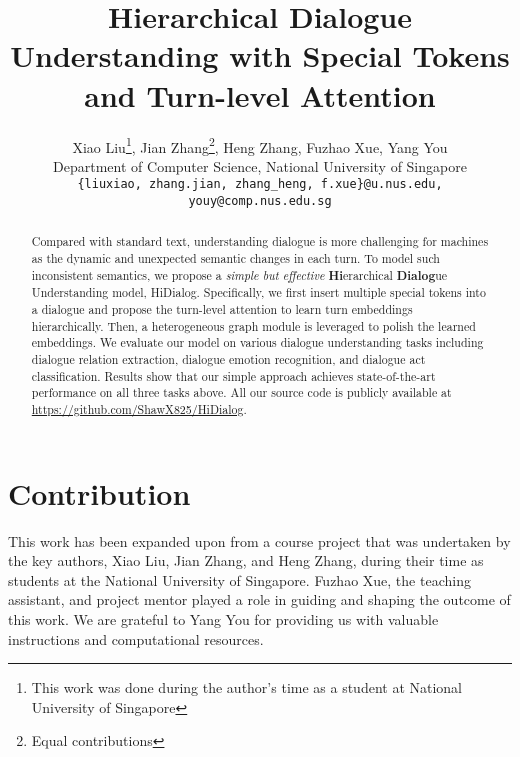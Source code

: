 \documentclass{article} %
\title{Hierarchical Dialogue Understanding with Special Tokens and Turn-level Attention}
\author{Xiao Liu\thanks{This work was done during the author's time as a student at National University of Singapore}, Jian Zhang\thanks{Equal contributions}, Heng Zhang\samethanks, Fuzhao Xue, Yang You \\
Department of Computer Science, National University of Singapore\\
\texttt{\{liuxiao, zhang.jian, zhang\_heng, f.xue\}@u.nus.edu,} \\ \texttt{youy@comp.nus.edu.sg} \\
}
\newcommand{\LX}[1]{\textcolor{teal}{[Xiao: #1]}}
\newcommand{\FZ}[1]{\textcolor{red}{[Fuzhao: #1]}}
\begin{document}
\maketitle

\begin{abstract}
Compared with standard text, understanding dialogue is more challenging for machines as the dynamic and unexpected semantic changes in each turn. To model such inconsistent semantics, we propose a \emph{simple but effective} \textbf{Hi}erarchical \textbf{Dialog}ue Understanding model, HiDialog. Specifically, we first insert multiple special tokens into a dialogue and propose the turn-level attention to learn turn embeddings hierarchically. Then, a heterogeneous graph module is leveraged to polish the learned embeddings. We evaluate our model on various dialogue understanding tasks including dialogue relation extraction, dialogue emotion recognition, and dialogue act classification. Results show that our simple approach achieves state-of-the-art performance on all three tasks above. All our source code is publicly available at \url{https://github.com/ShawX825/HiDialog}.
\end{abstract}












\section*{Contribution}
This work has been expanded upon from a course project that was undertaken by the key authors, Xiao Liu, Jian Zhang, and Heng Zhang, during their time as students at the National University of Singapore. Fuzhao Xue, the teaching assistant, and project mentor played a role in guiding and shaping the outcome of this work. We are grateful to Yang You for providing us with valuable instructions and computational resources. 
\end{document}
